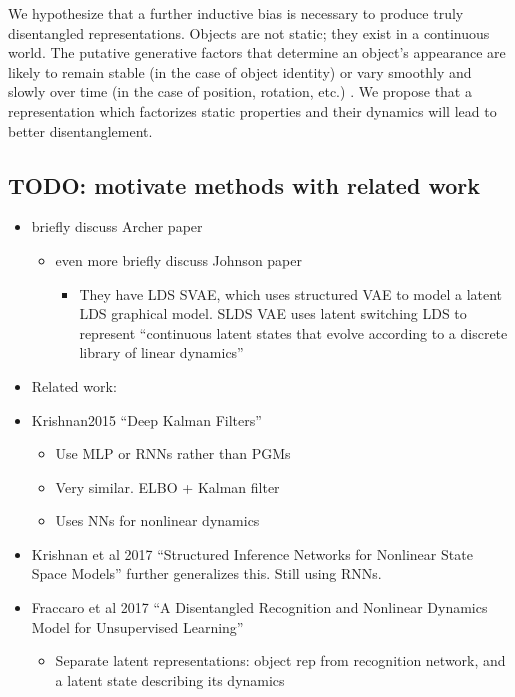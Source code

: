 \documentclass[10pt,letterpaper]{article}
\begin{document}
We hypothesize that a further inductive bias is necessary to produce truly disentangled representations. Objects are not static; they exist in a continuous world. The putative generative factors that determine an object’s appearance are likely to remain stable (in the case of object identity) or vary smoothly and slowly over time (in the case of position, rotation, etc.) \cite{Wiskott2002}. We propose that a representation which factorizes static properties and their dynamics will lead to better disentanglement.

\subsection*{TODO: motivate methods with related work}
\begin{itemize}
    \item briefly discuss Archer paper \cite{Archer2016}
    \begin{itemize}
        \item even more briefly discuss Johnson paper \cite{Johnson2016}
        \begin{itemize}
            \item They have LDS SVAE, which uses structured VAE to model a latent LDS graphical model. SLDS VAE uses latent switching LDS to represent ``continuous latent states that evolve according to a discrete library of linear dynamics''
        \end{itemize}
    \end{itemize}
    \item Related work: \cite{Gregor2015a,Krishnan2015,Watter2015,Karl2016,Fraccaro2016,Fraccaro2017a,Krishnan2017}
    \item Krishnan2015 ``Deep Kalman Filters''
    \begin{itemize}
        \item Use MLP or RNNs rather than PGMs
        \item Very similar. ELBO + Kalman filter
        \item Uses NNs for nonlinear dynamics
    \end{itemize}
    \item Krishnan et al 2017 ``Structured Inference Networks for Nonlinear State Space Models'' further generalizes this. Still using RNNs.
    \item Fraccaro et al 2017 ``A Disentangled Recognition and Nonlinear Dynamics Model for Unsupervised Learning''
    \begin{itemize}
        \item Separate latent representations: object rep from recognition network, and a latent state describing its dynamics

\end{itemize}
\end{itemize}
\end{document}
